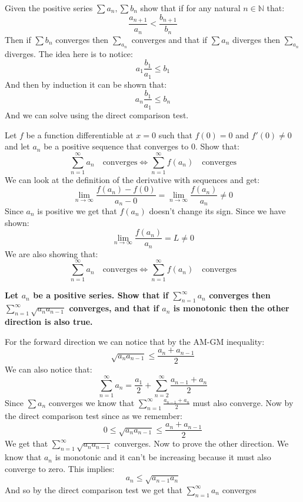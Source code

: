 \documentclass{article}
\theoremstyle{plain}
\newcommand{\N}{\mathbb{N}}
\begin{document}
	Given the positive series $\sum{a_n},\sum{b_n}$ show that
	if for any natural $n\in\N$ that:
	\[
	\frac{a_{n+1}}{a_{n}} < \frac{b_{n+1}}{b_{n}}
	\]
	Then if $\sum{b_n}$ converges then $\sum_{a_n}$ converges and that if 
	$\sum{a_n}$ diverges then $\sum_{a_n}$ diverges.
	The idea here is to notice:
	\[
		a_1 \frac{b_1}{a_1} \le b_1
	\]
	And then by induction it can be shown that:
	\[
		a_n \frac{b_1}{a_1} \le b_n
	\]
	And we can solve using the direct comparison test.
	
	\newpage
	
	Let $f$ be a function differentiable at $x=0$ such that
	$f(0)=0$ and $f'(0)\neq 0$ and let $a_n$ be a positive sequence that
	converges to $0$. Show that:
	\[
	\sum_{n=1}^{\infty}{a_n} \quad\text{converges} \iff 
	\sum_{n=1}^{\infty}{f(a_n)} \quad\text{converges}
	\]
	We can look at the definition of the derivative with sequences and get:
	\[
		\lim_{n\to\infty}{\frac{f(a_n)-f(0)}{a_n-0}} = 
		\lim_{n\to\infty}{\frac{f(a_n)}{a_n}} \neq 0
	\]
	Since $a_n$ is positive we get that $f(a_n)$ doesn't change its sign.
	Since we have shown:
	\[
		\lim_{n\to\infty}{\frac{f(a_n)}{a_n}} = L \neq 0
	\]
	We are also showing that:
	\[
	\sum_{n=1}^{\infty}{a_n} \quad\text{converges} \iff 
	\sum_{n=1}^{\infty}{f(a_n)} \quad\text{converges}
	\]
	
	\newpage
	
	\textbf{Let $a_n$ be a positive series. Show that if 
	$\sum_{n=1}^{\infty}{a_n}$ converges then 
	$\sum_{n=1}^{\infty}{\sqrt{a_{n}a_{n-1}}}$ converges, and that if
	$a_n$ is monotonic then the other direction is also true.}
	
	For the forward direction we can notice that by the AM-GM inequality:
	\[
		 \sqrt{a_{n}a_{n-1}} \le \frac{a_{n}+a_{n-1}}{2}
	\]
	We can also notice that:
	\[
		\sum_{n=1}^{\infty}{a_n} = 
		\frac{a_1}{2} + \sum_{n=2}^{\infty}{\frac{a_{n-1}+a_n}{2}}
	\]
	Since $\sum{a_n}$ converges we know that 
	$\sum_{n=1}^{\infty}{\frac{a_{n-1}+a_n}{2}}$ must also converge. Now by
	the direct comparison test since as we remember:
	\[
		 0 \le \sqrt{a_{n}a_{n-1}} \le \frac{a_{n}+a_{n-1}}{2}
	\]
	We get that $\sum_{n=1}^{\infty}{\sqrt{a_{n}a_{n-1}}}$ converges.
	Now to prove the other direction. We know that $a_n$ is monotonic
	and it can't be increasing because it must also converge to zero.
	This implies:
	\[
		a_n \le \sqrt{a_{n-1}a_n}
	\]
	And so by the direct comparison test we get that 
	$\sum_{n=1}^{\infty}{a_n}$ converges
	
	\newpage
\end{document}
